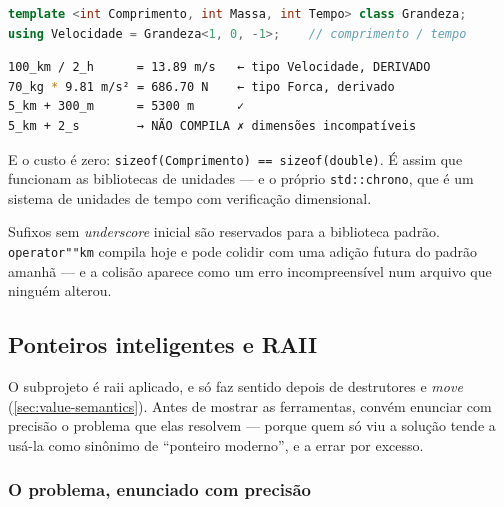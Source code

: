 \begin{lstlisting}[style=bt, language=C++,
    caption={Dimensões como expoentes no tipo.}]
template <int Comprimento, int Massa, int Tempo> class Grandeza;
using Velocidade = Grandeza<1, 0, -1>;    // comprimento / tempo
\end{lstlisting}

\begin{lstlisting}[style=bt, language=bash,
    caption={Saída de \texttt{src/operators/}: o tipo do resultado é derivado
             pelo compilador, e o erro dimensional é de compilação.}]
100_km / 2_h      = 13.89 m/s   ← tipo Velocidade, DERIVADO
70_kg * 9.81 m/s² = 686.70 N    ← tipo Forca, derivado
5_km + 300_m      = 5300 m      ✓
5_km + 2_s        → NÃO COMPILA ✗ dimensões incompatíveis
\end{lstlisting}

E o custo é zero: \texttt{sizeof(Comprimento) == sizeof(double)}. É assim que
funcionam as bibliotecas de unidades --- e o próprio \texttt{std::chrono}, que é
um sistema de unidades de tempo com verificação dimensional.

\begin{regra}
Sufixos sem \emph{underscore} inicial são reservados para a biblioteca padrão.
\texttt{operator""km} compila hoje e pode colidir com uma adição futura do
padrão amanhã --- e a colisão aparece como um erro incompreensível num arquivo
que ninguém alterou.
\end{regra}

\subsection{Ponteiros inteligentes e RAII}
\label{sec:smart-pointers}

O subprojeto  é \gls{raii} aplicado, e só faz sentido
depois de destrutores e \emph{move} (\cref{sec:value-semantics}). Antes de
mostrar as ferramentas, convém enunciar com precisão o problema que elas
resolvem --- porque quem só viu a solução tende a usá-la como sinônimo de
``ponteiro moderno'', e a errar por excesso.

\subsubsection{O problema, enunciado com precisão}


